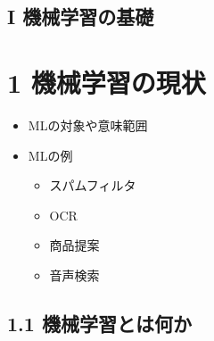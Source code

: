 \hypertarget{i-ux6a5fux68b0ux5b66ux7fd2ux306eux57faux790e}{%
\subsection{I
機械学習の基礎}\label{i-ux6a5fux68b0ux5b66ux7fd2ux306eux57faux790e}}

\hypertarget{ux6a5fux68b0ux5b66ux7fd2ux306eux73feux72b6}{%
\section{1
機械学習の現状}\label{ux6a5fux68b0ux5b66ux7fd2ux306eux73feux72b6}}

\begin{itemize}
\tightlist
\item
  MLの対象や意味範囲
\item
  MLの例

  \begin{itemize}
  \tightlist
  \item
    スパムフィルタ
  \item
    OCR
  \item
    商品提案
  \item
    音声検索
  \end{itemize}
\end{itemize}

\hypertarget{ux6a5fux68b0ux5b66ux7fd2ux3068ux306fux4f55ux304b}{%
\subsection{1.1
機械学習とは何か}\label{ux6a5fux68b0ux5b66ux7fd2ux3068ux306fux4f55ux304b}}

